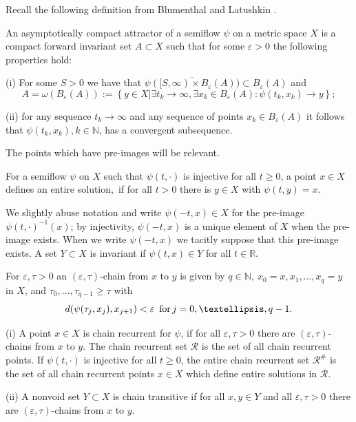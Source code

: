 \documentclass{siamltex}%
\begin{document}
Recall the following definition from Blumenthal and Latushkin
\cite[Definitions 2.3 and 2.7]{BluL19}.

\begin{definition}
An asymptotically compact attractor of a semiflow $\psi$ on a metric space $X$
is a compact forward invariant set $A\subset X$ such that for some
$\varepsilon>0$ the following properties hold:

(i) For some $S>0$ we have that $\overline{\psi([S,\infty)\times
B_{\varepsilon}(A))}\subset B_{\varepsilon}(A)$ and%
\[
A=\omega(B_{\varepsilon}(A)):=\left\{  y\in X\left\vert \exists t_{k}%
\rightarrow\infty,\exists x_{k}\in B_{\varepsilon}(A):\psi(t_{k}%
,x_{k})\rightarrow y\right.  \right\}  ;
\]


(ii) for any sequence $t_{k}\rightarrow\infty$ and any sequence of points
$x_{k}\in B_{\varepsilon}(A)$ it follows that $\psi(t_{k},x_{k}),k\in
\mathbb{N}$, has a convergent subsequence.
\end{definition}

The points which have pre-images will be relevant.

\begin{definition}
\label{Definition_entire}For a semiflow $\psi$ on $X$ such that $\psi
(t,\cdot)$ is injective for all $t\geq0$, a point $x\in X$ defines an entire
solution,\ if for all $t>0$ there is $y\in X$ with $\psi(t,y)=x$.
\end{definition}

We slightly abuse notation and write $\psi(-t,x)\in X$ for the pre-image
$\psi(t,\cdot)^{-1}(x)$; by injectivity, $\psi(-t,x)$ is a unique element of
$X$ when the pre-image exists. When we write $\psi(-t,x)$ we tacitly suppose
that this pre-image exists. A set $Y\subset X$ is invariant if $\psi(t,x)\in
Y$ for all $t\in\mathbb{R}$.

For $\varepsilon,\tau>0$ an $(\varepsilon,\tau)$-chain from $x$ to $y$ is
given by $q\in\mathbb{N},\ x_{0}\allowbreak=x,x_{1},\ldots,x_{q}=y$ in $X$,
and $\tau_{0},\ldots,\tau_{q-1}\geq\tau$ with
\[
d(\psi(\tau_{j},x_{j}),x_{j+1})<\varepsilon\text{ }\,\text{for\thinspace
}j=0,\ldots,q-1.
\]


\begin{definition}
\label{Definition_chain_trans}(i) A point $x\in X$ is chain recurrent for
$\psi$, if for all $\varepsilon,\tau>0$ there are $(\varepsilon,\tau)$-chains
from $x$ to $y$. The chain recurrent set $\mathcal{R}$ is the set of all chain
recurrent points. If $\psi(t,\cdot)$ is injective for all $t\geq0$, the entire
chain recurrent set $\mathcal{R}^{\#}$ is the set of all chain recurrent
points $x\in X$ which define entire solutions in $\mathcal{R}$.

(ii) A nonvoid set $Y\subset X$ is chain transitive if for all $x,y\in Y$ and
all $\varepsilon,\tau>0$ there are $(\varepsilon,\tau)$-chains from $x$ to $y$.
\end{definition}
\end{document}
